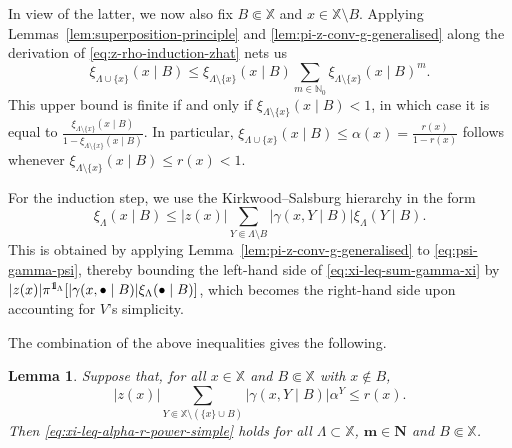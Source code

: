 \documentclass[10pt,a4paper]{amsart}
\newtheorem{lemma}[theorem]{Lemma}
\newcommand{\N}{\mathbb{N}}
\newcommand{\X}{\mathbb X}
\newcommand{\be}{\begin{equation}}
\newcommand{\ee}{\end{equation}}
\def\1{{\mathchoice {1\mskip-4mu\mathrm l}      
{1\mskip-4mu\mathrm l}
{1\mskip-4.5mu\mathrm l} {1\mskip-5mu\mathrm l}}}
\begin{document}
In view of the latter, we now also fix $B \Subset \X$ and $x \in \X \setminus B$. 
Applying Lemmas~\ref{lem:superposition-principle} and \ref{lem:pi-z-conv-g-generalised} along the derivation of \eqref{eq:z-rho-induction-zhat} nets us
\be \label{eq:xi-x-in-x-out}
	\xi_{\Lambda \cup \{x\}}(x \mid B) \leq \xi_{\Lambda \setminus \{x\}}(x \mid B) \sum_{m \in \N_0} \xi_{\Lambda \setminus \{x\}}(x \mid B)^m.
\ee
This upper bound is finite if and only if $\xi_{\Lambda \setminus \{x\}}(x \mid B) < 1$, in which case it is equal to $\frac{\xi_{\Lambda \setminus \{x\}}(x \mid B)}{1-\xi_{\Lambda \setminus \{x\}}(x \mid B)}$. 
In particular, $\xi_{\Lambda \cup \{x\}}(x \mid B) \leq \alpha(x) = \frac{r(x)}{1-r(x)}$ follows whenever $\xi_{\Lambda \setminus \{x\}}(x \mid B) \leq r(x) < 1$.

For the induction step, we use the Kirkwood--Salsburg hierarchy in the form
\be \label{eq:xi-leq-sum-gamma-xi}
	\xi_\Lambda(x \mid B) \leq |z(x)| \sum_{Y \Subset \Lambda \setminus B} |\gamma(x, Y \mid B)| \xi_\Lambda(Y \mid B).
\ee
This is obtained by applying Lemma~\ref{lem:pi-z-conv-g-generalised} to \eqref{eq:psi-gamma-psi}, thereby bounding the left-hand side of \eqref{eq:xi-leq-sum-gamma-xi} by $|z(x)| \pi^{\1_\Lambda}[|\gamma(x, \bullet \mid B)| \xi_\Lambda(\bullet \mid B)]$, which becomes the right-hand side upon accounting for $V$'s simplicity.

The combination of the above inequalities gives the following.

\begin{lemma} \label{lem:xi-KS-induction}
	Suppose that, for all $x \in \X$ and $B \Subset \X$ with $x \notin B$,
	\[
		|z(x)| \sum_{Y \Subset \X \setminus (\{x\} \cup B)} |\gamma(x, Y \mid B)| \alpha^Y \leq r(x).
	\]
	Then \eqref{eq:xi-leq-alpha-r-power-simple} holds for all $\Lambda \subset \X$, $\mathbf m \in \mathbf N$ and $B \Subset \X$.
\end{lemma}
\end{document}
